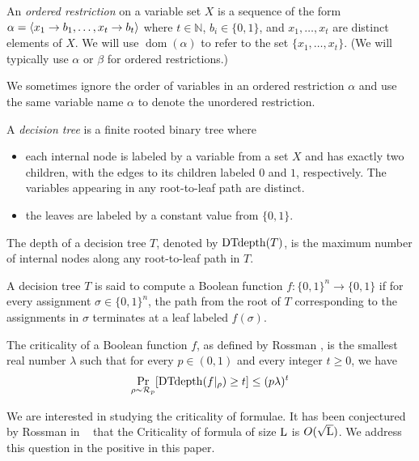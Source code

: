 \begin{definition}  %
\label{def:ordered-restriction}
An \emph{ordered restriction} on a variable set $X$ is a sequence of the form $\alpha = \left\langle x_{1} \to b_1, \dots, x_{t} \to b_t \right\rangle$ where $t \in \mathbb{N}$, $b_i \in \{0, 1\}$, and $x_1, \dots, x_t$ are distinct elements of $X$. We will use $\operatorname{dom}(\alpha)$ to refer to the set $\{x_{1}, \dots, x_{t}\}$. (We will typically use $\alpha$ or $\beta$ for ordered restrictions.)

We sometimes ignore the order of variables in an ordered restriction $\alpha$ and use the same variable name $\alpha$ to denote the unordered restriction.
\end{definition}

\begin{definition}
\label{def:decision-tree}
A \emph{decision tree} is a finite rooted binary tree where
\begin{itemize}
    \item each internal node is labeled by a variable from a set $X$ and has exactly two children, with the edges to its children labeled $0$ and $1$, respectively. The variables appearing in any root-to-leaf path are distinct.
    \item the leaves are labeled by a constant value from $\{0, 1\}$.
\end{itemize}
The depth of a decision tree $T$, denoted by $\operatorname{DTdepth}(T)$, is the maximum number of internal nodes along any root-to-leaf path in $T$.

A decision tree $T$ is said to compute a Boolean function $f \colon \{0,1\}^n \to \{0,1\}$ if for every assignment $\sigma \in \{0,1\}^n$, the path from the root of $T$ corresponding to the assignments in $\sigma$ terminates at a leaf labeled $f(\sigma)$.
\end{definition}

\begin{definition}[Criticality]
\label{def:criticality}
The criticality of a Boolean function $f$, as defined by Rossman \cite{rossmanCriticalityRegularFormulas2019}, is the smallest real number $\lambda$ such that for every $p \in (0,1)$ and every integer $t \geq 0$, we have
\[
\Pr_{\rho \sim \mathbf{\mathcal{R}}_p}[\operatorname{DTdepth}(f|_{\rho}) \geq t] \leq (p\lambda)^t
\]
\end{definition}
We are interested in studying the criticality of \demorgan formulae. It has been conjectured by Rossman in ~\cite{rossmanCriticalityRegularFormulas2019}  that the Criticality of \demorgan formula of size $\mathrm{L}$ is $O(\sqrt{\mathrm{L}})$. We address this question in the positive in this paper. 


